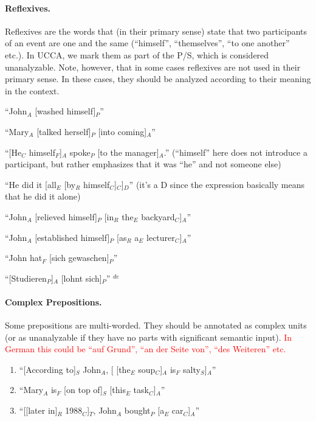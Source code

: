 \documentclass[11pt]{article}
\newcommand{\be}{\begin{enumerate}}
\newcommand{\ee}{\end{enumerate}}
\newcommand{\german}[1]{{\color{red}#1$^{de}$}}
\begin{document}
\paragraph{Reflexives.} Reflexives are the words that (in their primary sense) state that two participants of an event are one and the same (``himself'', ``themselves'', ``to one another'' etc.). In UCCA, we mark them as part of the P/S, which is considered unanalyzable. Note, however, that in some cases reflexives are not used in their primary sense. In these cases, they should be analyzed according to their meaning in the context.
\be \item
``John$_A$ [washed himself]$_P$''
\item
``Mary$_A$ [talked herself]$_P$ [into coming]$_A$''
\item
``[He$_C$ himself$_F$]$_A$ spoke$_P$ [to the manager]$_A$.'' (``himself'' here does not introduce a participant, but rather emphasizes that it was ``he'' and not someone else)
\item
``He did it [all$_E$ [by$_R$ himself$_C$]$_C$]$_D$'' (it's a D since the expression basically means that he did it alone)
\item
``John$_A$ [relieved himself]$_P$ [in$_R$ the$_E$ backyard$_C$]$_A$''
\item
``John$_A$ [established himself]$_P$ [as$_R$ a$_E$ lecturer$_C$]$_A$''
\german{
\item
``John hat$_F$ [sich gewaschen]$_P$''
\item
``[Studieren$_P$]$_A$ [lohnt sich]$_P$''
}
\ee

\paragraph{Complex Prepositions.} Some prepositions are multi-worded. They should be annotated as complex units (or as unanalyzable if they have no parts with significant semantic input). \textcolor{red}{In German this could be ``auf Grund'', ``an der Seite von'', ``des Weiteren'' etc.}
\be \item
``[According to]$_S$ John$_A$, [ [the$_E$ soup$_C$]$_A$ is$_F$ salty$_S$]$_A$''
\item
``Mary$_A$ is$_F$ [on top of]$_S$ [this$_E$ task$_C$]$_A$''
\item
``[[later in]$_R$ 1988$_C$]$_T$, John$_A$ bought$_P$ [a$_E$ car$_C$]$_A$''
\ee
\end{document}
